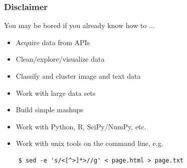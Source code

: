 \documentclass[xcolor=dvipsnames, 9pt]{beamer}
\begin{document}
\begin{frame}[fragile]
  \frametitle{Disclaimer} %
  
    You may be bored if you already know how to ...

      \begin{itemize}
        \item Acquire data from APIs
        \item Clean/explore/visualize data
        \item Classify and cluster image and text data
        \item Work with large data sets
        \item Build simple mashups
        \item Work with Python, R, SciPy/NumPy, etc.
        \item Work with unix tools on the command line, e.g.
      \end{itemize}

  \begin{verbatim}
    $ sed -e 's/<[^>]*>//g' < page.html > page.txt
  \end{verbatim}







\end{frame}
\end{document}
